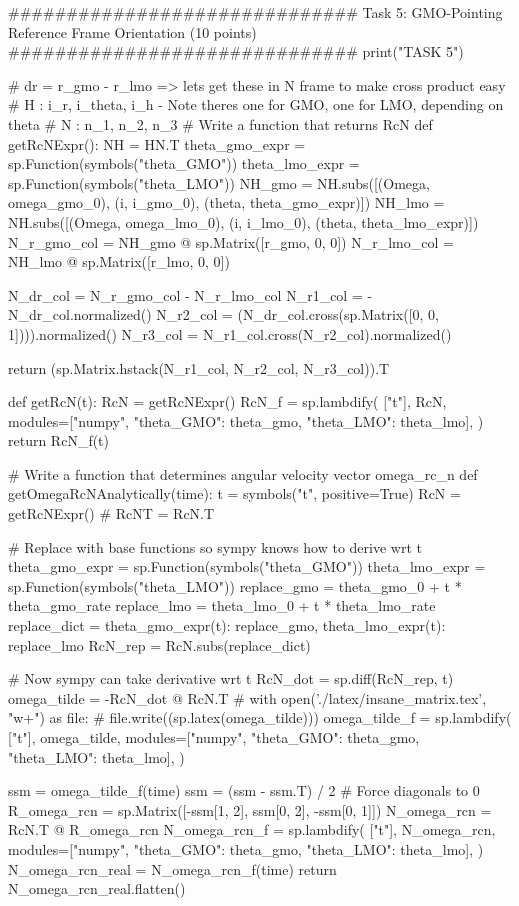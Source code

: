 \documentclass[conf]{new-aiaa}
\begin{document}
\begin{pythoncode}
############################## Task 5: GMO-Pointing Reference Frame Orientation (10 points) ##############################
print("\n\nBEGIN TASK 5")


# dr = r_gmo - r_lmo  => lets get these in N frame to make cross product easy
# H : {i_r, i_theta, i_h} - Note theres one for GMO, one for LMO, depending on theta
# N : {n_1, n_2, n_3}
# Write a function that returns RcN
def getRcNExpr():
    NH = HN.T
    theta_gmo_expr = sp.Function(symbols("theta_GMO"))
    theta_lmo_expr = sp.Function(symbols("theta_LMO"))
    NH_gmo = NH.subs([(Omega, omega_gmo_0), (i, i_gmo_0), (theta, theta_gmo_expr)])
    NH_lmo = NH.subs([(Omega, omega_lmo_0), (i, i_lmo_0), (theta, theta_lmo_expr)])
    N_r_gmo_col = NH_gmo @ sp.Matrix([r_gmo, 0, 0])
    N_r_lmo_col = NH_lmo @ sp.Matrix([r_lmo, 0, 0])

    N_dr_col = N_r_gmo_col - N_r_lmo_col
    N_r1_col = -N_dr_col.normalized()
    N_r2_col = (N_dr_col.cross(sp.Matrix([0, 0, 1]))).normalized()
    N_r3_col = N_r1_col.cross(N_r2_col).normalized()

    return (sp.Matrix.hstack(N_r1_col, N_r2_col, N_r3_col)).T


def getRcN(t):
    RcN = getRcNExpr()
    RcN_f = sp.lambdify(
        ["t"],
        RcN,
        modules=["numpy", {"theta_GMO": theta_gmo}, {"theta_LMO": theta_lmo}],
    )
    return RcN_f(t)


# Write a function that determines angular velocity vector omega_rc_n
def getOmegaRcNAnalytically(time):
    t = symbols("t", positive=True)
    RcN = getRcNExpr()
    # RcNT = RcN.T

    # Replace with base functions so sympy knows how to derive wrt t
    theta_gmo_expr = sp.Function(symbols("theta_GMO"))
    theta_lmo_expr = sp.Function(symbols("theta_LMO"))
    replace_gmo = theta_gmo_0 + t * theta_gmo_rate
    replace_lmo = theta_lmo_0 + t * theta_lmo_rate
    replace_dict = {theta_gmo_expr(t): replace_gmo, theta_lmo_expr(t): replace_lmo}
    RcN_rep = RcN.subs(replace_dict)

    # Now sympy can take derivative wrt t
    RcN_dot = sp.diff(RcN_rep, t)
    omega_tilde = -RcN_dot @ RcN.T
    # with open('./latex/insane_matrix.tex', "w+") as file:
    #     file.write((sp.latex(omega_tilde)))
    omega_tilde_f = sp.lambdify(
        ["t"],
        omega_tilde,
        modules=["numpy", {"theta_GMO": theta_gmo}, {"theta_LMO": theta_lmo}],
    )

    ssm = omega_tilde_f(time)
    ssm = (ssm - ssm.T) / 2  # Force diagonals to 0
    R_omega_rcn = sp.Matrix([-ssm[1, 2], ssm[0, 2], -ssm[0, 1]])
    N_omega_rcn = RcN.T @ R_omega_rcn
    N_omega_rcn_f = sp.lambdify(
        ["t"],
        N_omega_rcn,
        modules=["numpy", {"theta_GMO": theta_gmo}, {"theta_LMO": theta_lmo}],
    )
    N_omega_rcn_real = N_omega_rcn_f(time)
    return N_omega_rcn_real.flatten()



\end{pythoncode}
\end{document}
